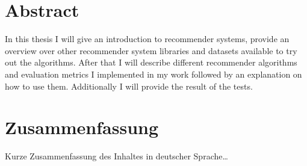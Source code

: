 \begingroup
\let\clearpage\relax
\let\cleardoublepage\relax
\let\cleardoublepage\relax

\chapter*{Abstract}
In this thesis I will give an introduction to recommender systems, provide an overview over other recommender system libraries and datasets available to try out the algorithms. After that I will describe different recommender algorithms and evaluation metrics I implemented in my work followed by an explanation on how to use them. Additionally I will provide the result of the tests.


\vfill

\chapter*{Zusammenfassung}
Kurze Zusammenfassung des Inhaltes in deutscher Sprache\dots


\endgroup			

\vfill

\cleardoublepage